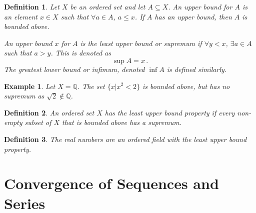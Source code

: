 \documentclass{article}
\theoremstyle{plain}\theoremheaderfont{\normalfont\itshape}\theorembodyfont{\rmfamily}\theoremseparator{.}\newtheorem*{rem}{Remark}\newtheorem*{ex}{Example}\newtheorem*{proof}{Proof}\newtheorem*{altp}{Alternative proof}
\theoremstyle{plain}\theoremheaderfont{\normalfont\bfseries}\theorembodyfont{\rmfamily}\theoremseparator{.}\newtheorem{thm}{Theorem}[section]\newtheorem{lem}[thm]{Lemma}\newtheorem{prop}[thm]{Proposition}\newtheorem*{cor}{Corollary}\newtheorem{defn}[thm]{Definition}\newtheorem{clm}[thm]{Claim}\newtheorem{clminproof}{Claim}
\theoremstyle{break}\theoremheaderfont{\normalfont\itshape}\theorembodyfont{\rmfamily}\theoremseparator{.\medskip}\newtheorem*{proofskip}{Proof}\newtheorem*{exs}{Examples}\newtheorem*{rems}{Remarks}
\theoremstyle{break}\theoremheaderfont{\normalfont\bfseries}\theorembodyfont{\rmfamily}\theoremseparator{.\medskip}\newtheorem{lemskip}[thm]{Lemma}\newtheorem{defnskip}[thm]{Definition}\newtheorem{propskip}[thm]{Proposition}\newtheorem{thmskip}[thm]{Theorem}
\begin{document}
    \begin{defn}
        Let \(X\) be an ordered set and let \(A\subseteq X\). An \textit{upper bound} for \(A\) is an element \(x\in X\) such that \(\forall a\in A\), \(a\le x\). If \(A\) has an upper bound, then \(A\) is \textit{bounded above}.

        An upper bound \(x\) for \(A\) is the \textit{least upper bound} or \textit{supremum} if \(\forall y<x\), \(\exists a\in A\) such that \(a>y\). This is denoted as
        \[\sup A=x\,.\]
        The \textit{greatest lower bound} or \textit{infimum}, denoted \(\inf A\) is defined similarly.
    \end{defn}
    \begin{ex}
        Let \(X=\mathbb{Q}\). The set \(\{x|x^2<2\}\) is bounded above, but has no supremum as \(\sqrt{2}\notin\mathbb{Q}\).
    \end{ex}
    \begin{defn}
        An ordered set \(X\) has the \textit{least upper bound property} if every non-empty subset of \(X\) that is bounded above has a supremum.
    \end{defn}
    \begin{defn}
        The \textit{real numbers} are an ordered field with the least upper bound property.
    \end{defn}

    \section{Convergence of Sequences and Series}
\end{document}
